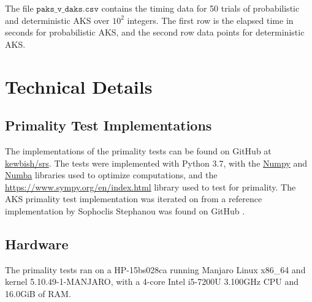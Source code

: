 \documentclass{article}
\begin{document}
\begin{appendices}
The file $\texttt{paks\_v\_daks.csv}$ contains the timing data for 50 trials of probabilistic and deterministic AKS over $10^2$ integers. The first row is the elapsed time in seconds for probabilistic AKS, and the second row data points for deterministic AKS.

\section{Technical Details} \label{appendix:tech}

\subsection{Primality Test Implementations}
The implementations of the primality tests can be found on GitHub at \href{https://github.com/kewbish/srs}{kewbish/srs}.
The tests were implemented with Python 3.7, with the \href{https://numpy.org/}{Numpy} and \href{http://numba.pydata.org/}{Numba} libraries used to optimize computations, and the \href{Sympy}{https://www.sympy.org/en/index.html} library used to test for primality.
The AKS primality test implementation was iterated on from a reference implementation by Sophoclis Stephanou was found on GitHub \cite{stephanou_ssophoclis/aks-algorithm:_2020}.

\subsection{Hardware}
The primality tests ran on a HP-15bs028ca running Manjaro Linux x86\_64 and kernel 5.10.49-1-MANJARO, with a 4-core Intel i5-7200U 3.100GHz CPU and 16.0GiB of RAM.

\end{appendices}
\end{document}
